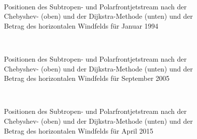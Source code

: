 \begin{figure}
  \centering
    \begin{minipage}{\textwidth}
  \end{minipage} \\ 
  \begin{minipage}{\textwidth}
  \end{minipage}
  \caption[Vergleich der Chebyshev- und der Dijkstra-Methode für den Januar 1994]{Positionen des Subtropen- und Polarfrontjetstream nach der Chebyshev- (oben) und der Dijkstra-Methode (unten) und der Betrag des horizontalen Windfelds für Januar 1994}
\end{figure}


\begin{figure}
  \centering
    \begin{minipage}{\textwidth}
  \end{minipage} \\ 
  \begin{minipage}{\textwidth}
  \end{minipage}
  \caption[Vergleich der Chebyshev- und der Dijkstra-Methode für den September 2005]{Positionen des Subtropen- und Polarfrontjetstream nach der Chebyshev- (oben) und der Dijkstra-Methode (unten) und der Betrag des horizontalen Windfelds für September 2005}
\end{figure}


\begin{figure}
  \centering
    \begin{minipage}{\textwidth}
  \end{minipage} \\ 
  \begin{minipage}{\textwidth}
  \end{minipage}
  \caption[Vergleich der Chebyshev- und der Dijkstra-Methode für den April 2015]{Positionen des Subtropen- und Polarfrontjetstream nach der Chebyshev- (oben) und der Dijkstra-Methode (unten) und der Betrag des horizontalen Windfelds für April 2015}
\end{figure}






